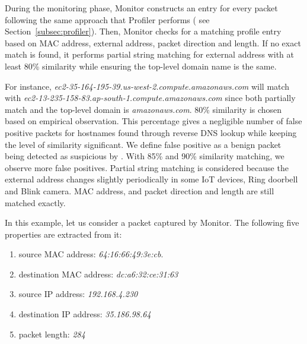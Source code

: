 During the monitoring phase, Monitor constructs an entry for every packet following the same approach that Profiler performs ( see Section~\ref{subsec:profiler}). Then, Monitor checks for a matching profile entry based on MAC address, external address, packet direction and length. If no exact match is found, it performs partial string matching for external address with at least 80\% similarity while ensuring the top-level domain name is the same. 
 
For instance, \textit{ec2-35-164-195-39.us-west-2.compute.amazonaws.com} will match with \textit{ec2-13-235-158-83.ap-south-1.compute.amazonaws.com} since both partially match and the top-level domain is \textit{amazonaws.com}. 80\% similarity is chosen based on empirical observation. This percentage gives a negligible number of false positive packets for hostnames found through reverse DNS lookup while keeping the level of similarity significant. We define false positive as a benign packet being detected as suspicious by \system{}. With 85\% and 90\% similarity matching, we observe more false positives. Partial string matching is considered because the external address changes slightly periodically in some IoT devices, \eg{} Ring doorbell and Blink camera. MAC address, and packet direction and length are still matched exactly. 

In this example, let us consider a packet captured by Monitor. The following five properties are extracted from it: 
\begin{enumerate}
    \item source MAC address: \textit{64:16:66:49:3e:cb}.
    \item destination MAC address: \textit{dc:a6:32:ce:31:63}
    \item source IP address: \textit{192.168.4.230}
    \item destination IP address: \textit{35.186.98.64}
    \item packet length: \textit{284}
\end{enumerate}

